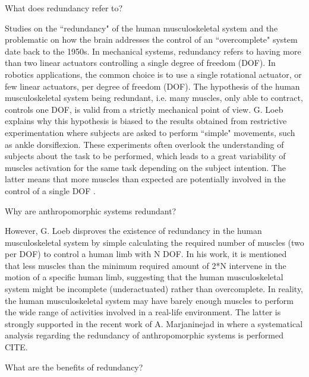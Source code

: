 What does redundancy refer to?

Studies on the ``redundancy" of the human musculoskeletal system and the problematic on how the brain addresses the control of an ``overcomplete" system date back to the 1950s. In mechanical systems, redundancy refers to having more than two linear actuators controlling a single degree of freedom (DOF). In robotics applications, the common choice is to use a single rotational actuator,  or few linear actuators, per degree of freedom (DOF). The hypothesis of the human musculoskeletal system being redundant, i.e. many muscles, only able to contract, controls one DOF, is valid from a strictly mechanical point of view. G. Loeb explains why this hypothesis is biased to the results obtained from restrictive experimentation where subjects are asked to perform ``simple" movements, such as ankle dorsiflexion. These experiments often overlook the understanding of subjects about the task to be performed, which leads to a great variability of muscles activation for the same task depending on the subject intention. The latter means that more muscles than expected are potentially involved in the control of  a single DOF \cite{loeb2000overcomplete}.

Why are anthropomorphic systems redundant?

However, G. Loeb disproves the existence of redundancy in the human musculoskeletal system by simple calculating the required number of muscles (two per DOF) to control a human limb with N DOF. In his work, it is mentioned that less muscles than the minimum required amount of 2*N intervene in the motion of a specific human limb, suggesting that the human musculoskeletal system might be incomplete (underactuated) rather than overcomplete. In reality, the human musculoskeletal system may have barely enough muscles to perform the wide range of activities involved in a real-life environment. The latter is strongly supported in the recent work of A. Marjaninejad \etal in where a systematical analysis regarding the redundancy of anthropomorphic systems is performed CITE. 

What are the benefits of redundancy?

